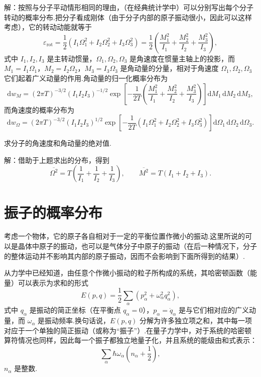 \begin{xiti}
解：按照与分子平动情形相同的理由，（在经典统计学中）可以分别写出每个分子转动的概率分布.把分子看成刚体（由于分子内部的原子振动很小，因此可以这样考虑），它的转动动能就等于
\begin{equation*}
  \varepsilon_{\mathrm{rot}}=\frac{1}{2}\left(I_1\Omega_1^2+I_2\Omega_2^2+I_3\Omega_3^2\right)
  =\frac{1}{2}\left(\frac{M_1^2}{I_1}+\frac{M_2^2}{I_2}+\frac{M_3^2}{I_3}\right),
\end{equation*}
式中 $I_1,I_2,I_3$ 是主转动惯量，$\Omega_1,\Omega_2,\Omega_3$ 是角速度在惯量主轴上的投影，而 $M_1=I_1\Omega_1$，$M_2=I_2\Omega_2$，$M_3=I_3\Omega_3$ 是角动量的分量，相对于角速度 $\Omega_1,\Omega_2,\Omega_3$ 它们起着广义动量的作用.角动量的归一化概率分布为
\begin{equation*}
  \mathrm{d}w_M=(2\pi T)^{-3/2}\left(I_1I_2I_3\right)^{-1/2}
  \exp\left[-\frac{1}{2T}\left(\frac{M_1^2}{I_1}+\frac{M_2^2}{I_2}+\frac{M_3^2}{I_3}\right)\right]\mathrm{d}M_1\,\mathrm{d}M_2\,\mathrm{d}M_3,
\end{equation*}
而角速度的概率分布为
\begin{equation*}
  \mathrm{d}w_\Omega=(2\pi T)^{-3/2}\left(I_1I_2I_3\right)^{1/2}
  \exp\left[-\frac{1}{2T}\left(I_1\Omega_1^2+I_2\Omega_2^2+I_3\Omega_3^2\right)\right]\mathrm{d}\Omega_1\,\mathrm{d}\Omega_2\,\mathrm{d}\Omega_3.
\end{equation*}

\quad 求分子的角速度和角动量的绝对值.

解：借助于上题求出的分布，得到
\begin{equation*}
  \overline{\Omega^2}=T\left(\frac{1}{I_1}+\frac{1}{I_2}+\frac{1}{I_3}\right),\qquad
  \overline{M^2}=T\left(I_1+I_2+I_3\right).
\end{equation*}

\end{xiti}

\section{振子的概率分布}

考虑一个物体，它的原子各自相对于一定的平衡位置作微小的振动.这里所说的可以是晶体中原子的振动，也可以是气体分子中原子的振动（在后一种情况下，分子的整体运动并不影响其内部的原子振动，因而不会影响到下面所得到的结果）.

从力学中已经知道，由任意个作微小振动的粒子所构成的系统，其哈密顿函数（能量）可以表示为求和的形式
\begin{equation*}
  E(p,q)=\frac{1}{2}\sum_\alpha\left(p_\alpha^2+\omega_\alpha^2q_\alpha^2\right),
\end{equation*}
式中 $q_\alpha$ 是振动的简正坐标（在平衡点 $q_\alpha=0$），$p_\alpha=\dot{q}_\alpha$ 是与它们相对应的广义动量，而 $\omega_\alpha$ 是振动频率.换句话说，$E(p,q)$ 分解为许多独立项之和，其中每一项对应于一个单独的简正振动（或称为“振子”）.在量子力学中，对于系统的哈密顿算符情况也同样，因此每一个振子都独立地量子化，并且系统的能级由和式表示：
\begin{equation*}
  \sum_\alpha\hbar\omega_\alpha\left(n_\alpha+\frac{1}{2}\right),
\end{equation*}
$n_\alpha$ 是整数.

